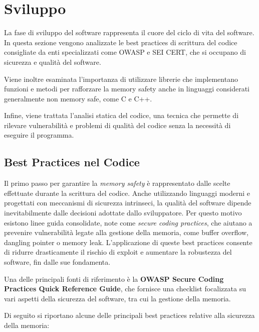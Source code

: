 \section{Sviluppo}
\label{sec:development}

La fase di sviluppo del software rappresenta il cuore del ciclo di vita del software.
In questa sezione vengono analizzate le best practices di scrittura del codice
consigliate da enti specializzati come OWASP e SEI CERT, che si occupano di sicurezza
e qualità del software.

Viene inoltre esaminata l'importanza di utilizzare librerie che implementano funzioni
e metodi per rafforzare la memory safety anche in linguaggi considerati generalmente
non memory safe, come C e C++.

Infine, viene trattata l'analisi statica del codice, una tecnica che permette di
rilevare vulnerabilità e problemi di qualità del codice senza la necessità di
eseguire il programma.

\subsection{Best Practices nel Codice}
\label{sec:best-practices-codice}

Il primo passo per garantire la \textit{memory safety} è rappresentato dalle
scelte effettuate durante la scrittura del codice. Anche utilizzando linguaggi moderni
e progettati con meccanismi di sicurezza intrinseci, la qualità del software
dipende inevitabilmente dalle decisioni adottate dallo sviluppatore. Per questo motivo
esistono linee guida consolidate, note come \textit{secure coding practices},
che aiutano a prevenire vulnerabilità legate alla gestione della memoria, come buffer
overflow, dangling pointer o memory leak. L'applicazione di queste best practices
consente di ridurre drasticamente il rischio di exploit e aumentare la robustezza
del software, fin dalle sue fondamenta.

Una delle principali fonti di riferimento è la \textbf{OWASP Secure Coding
Practices Quick Reference Guide}\cite{owasp_best_practices}, che fornisce una checklist
focalizzata su vari aspetti della sicurezza del software, tra cui la gestione
della memoria.

Di seguito si riportano alcune delle principali best practices relative alla
sicurezza della memoria:

